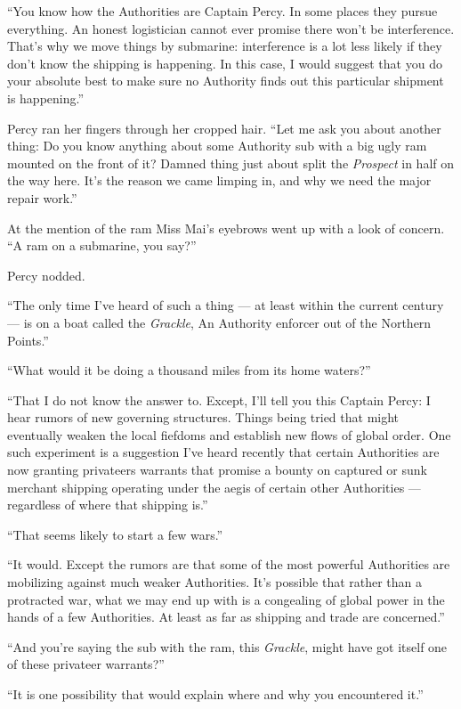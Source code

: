\documentclass[
]{scrbook}
\begin{document}
``You know how the Authorities are Captain Percy. In some places they
pursue everything. An honest logistician cannot ever promise there won't
be interference. That's why we move things by submarine: interference is
a lot less likely if they don't know the shipping is happening. In this
case, I would suggest that you do your absolute best to make sure no
Authority finds out this particular shipment is happening.''

Percy ran her fingers through her cropped hair. ``Let me ask you about
another thing: Do you know anything about some Authority sub with a big
ugly ram mounted on the front of it? Damned thing just about split the
\emph{Prospect} in half on the way here. It's the reason we came limping
in, and why we need the major repair work.''

At the mention of the ram Miss Mai's eyebrows went up with a look of
concern. ``A ram on a submarine, you say?''

Percy nodded.

``The only time I've heard of such a thing --- at least within the
current century --- is on a boat called the \emph{Grackle}, An Authority
enforcer out of the Northern Points.''

``What would it be doing a thousand miles from its home waters?''

``That I do not know the answer to. Except, I'll tell you this Captain
Percy: I hear rumors of new governing structures. Things being tried
that might eventually weaken the local fiefdoms and establish new flows
of global order. One such experiment is a suggestion I've heard recently
that certain Authorities are now granting privateers warrants that
promise a bounty on captured or sunk merchant shipping operating under
the aegis of certain other Authorities --- regardless of where that
shipping is.''

``That seems likely to start a few wars.''

``It would. Except the rumors are that some of the most powerful
Authorities are mobilizing against much weaker Authorities. It's
possible that rather than a protracted war, what we may end up with is a
congealing of global power in the hands of a few Authorities. At least
as far as shipping and trade are concerned.''

``And you're saying the sub with the ram, this \emph{Grackle}, might
have got itself one of these privateer warrants?''

``It is one possibility that would explain where and why you encountered
it.''
\end{document}

